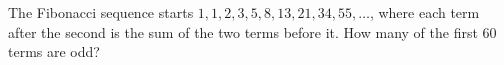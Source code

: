 The Fibonacci sequence starts $1,1,2,3,5,8,13,21,34,55,\dots$, where each term after the second is the sum of the two terms before it. How many of the first $60$ terms are odd?
